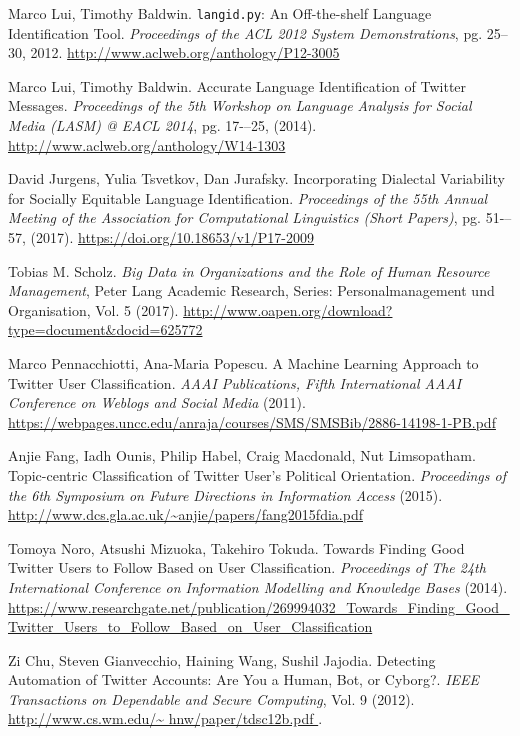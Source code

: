 \begin{thebibliography}{3}
 Marco Lui, Timothy Baldwin. {\tt langid.py}: An Off-the-shelf Language Identification Tool.
{\em Proceedings of the ACL 2012 System Demonstrations}, pg. 25--30, 2012.
\url{http://www.aclweb.org/anthology/P12-3005}

 Marco Lui, Timothy Baldwin. Accurate Language Identification of Twitter Messages. 
{\em Proceedings of the 5th Workshop on Language Analysis for Social Media (LASM) @ EACL 2014}, pg. 17-–25,
(2014). \url{http://www.aclweb.org/anthology/W14-1303}

 David Jurgens, Yulia Tsvetkov, Dan Jurafsky. Incorporating Dialectal Variability
for Socially Equitable Language Identification. 
{\em Proceedings of the 55th Annual Meeting of the Association for Computational Linguistics (Short Papers)}, 
pg. 51-–57, (2017). \url{https://doi.org/10.18653/v1/P17-2009}

 Tobias M. Scholz. {\em Big Data in Organizations and the Role of
Human Resource Management}, Peter Lang Academic Research, Series: Personalmanagement und
Organisation, Vol. 5 (2017). \url{http://www.oapen.org/download?type=document&docid=625772}

Marco Pennacchiotti, Ana-Maria Popescu. A Machine Learning Approach to Twitter User 
Classification. {\em AAAI Publications, Fifth International AAAI Conference on Weblogs and Social Media} (2011).
\url{https://webpages.uncc.edu/anraja/courses/SMS/SMSBib/2886-14198-1-PB.pdf }

 Anjie Fang, Iadh Ounis, Philip Habel, Craig Macdonald, Nut Limsopatham.
Topic-centric Classification of Twitter User’s Political Orientation. {\em Proceedings of the 
6th Symposium on Future Directions in Information Access} (2015).
\url{http://www.dcs.gla.ac.uk/~anjie/papers/fang2015fdia.pdf }

 Tomoya Noro, Atsushi Mizuoka, Takehiro Tokuda. 
Towards Finding Good Twitter Users to Follow Based on User Classification.
{\em Proceedings of The 24th International Conference on Information Modelling and Knowledge 
Bases} (2014). \url{https://www.researchgate.net/publication/269994032_Towards_Finding_Good_Twitter_Users_to_Follow_Based_on_User_Classification }

 Zi Chu, Steven Gianvecchio, Haining Wang, Sushil Jajodia. 
Detecting Automation of Twitter Accounts: Are You a Human, Bot, or Cyborg?.
{\em IEEE Transactions on Dependable and Secure Computing}, Vol. 9 (2012).
\url{http://www.cs.wm.edu/\~ hnw/paper/tdsc12b.pdf }.


\end{thebibliography}
